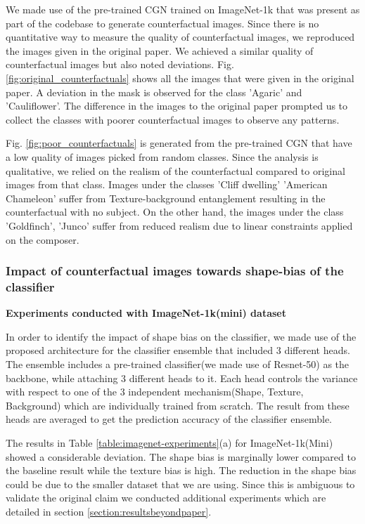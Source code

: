 We made use of the pre-trained CGN trained on ImageNet-1k that was present as part of the codebase to generate counterfactual images. 
Since there is no quantitative way to measure the quality of counterfactual images, we reproduced the images given in the original paper. We achieved a similar quality of counterfactual images but also noted deviations. 
Fig. \ref{fig:original_counterfactuals} shows all the images that were given in the original paper. A deviation in the mask is observed for the class 'Agaric' and 'Cauliflower'. 
The difference in the images to the original paper prompted us to collect the classes with poorer counterfactual images to observe any patterns. 

Fig. \ref{fig:poor_counterfactuals} is generated from the pre-trained CGN that have a low quality of images picked from random classes. Since the analysis is qualitative, we relied on the realism of the counterfactual compared to original images from that class.
Images under the classes 'Cliff dwelling' 'American Chameleon' suffer from Texture-background entanglement resulting in the counterfactual with no subject. On the other hand, the images under the class 'Goldfinch', 'Junco' suffer from reduced realism due to linear constraints applied on the composer.


\subsubsection{Impact of counterfactual images towards shape-bias of the classifier}

\textbf{Experiments conducted with ImageNet-1k(mini) dataset}
\label{section:textshapebg}

In order to identify the impact of shape bias on the classifier, we made use of the proposed architecture for the classifier ensemble that included 3 different heads. The ensemble includes a pre-trained classifier(we made use of Resnet-50) as the backbone, while attaching 3 different heads to it. Each head controls the variance with respect to one of the 3 independent mechanism(Shape, Texture, Background) which are individually trained from scratch. The result from these heads are averaged to get the prediction accuracy of the classifier ensemble.

The results in Table \ref{table:imagenet-experiments}(a) for ImageNet-1k(Mini) showed a considerable deviation. The shape bias is marginally lower compared to the baseline result while the texture bias is high. The reduction in the shape bias could be due to the smaller dataset that we are using. Since this is ambiguous to validate the original claim we conducted additional experiments which are detailed in section \ref{section:resultsbeyondpaper}. 


